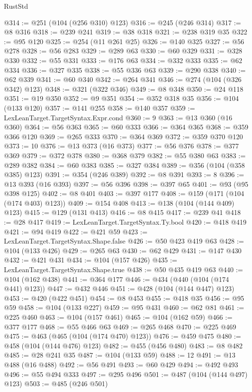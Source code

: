 \begin{lexlean}{RustStd}
\begin{coremodule}
{\begin{coremodule}
{{{{{{{{{{{{{{{{{{{{{{{{{{{{{{{{{{{@314 := @251 (@104 (@256 @310) @123)
@316 := @245 (@246 @314)
@317 := @8 @316
@318 := @239 @241
@319 := @38 @318
@321 := @238 @319 @35
@322 := @95 @120
@325 := @254 (@11 @261 @25)
@326 := @140 @325
@327 := @56 @278
@328 := @56 @283
@329 := @289 @63
@330 := @60 @329
@331 := @328 @330
@332 := @55 @331
@333 := @176 @63
@334 := @332 @333
@335 := @62 @334
@336 := @327 @335
@338 := @55 @336 @63
@339 := @290 @338
@340 := @62 @339
@341 := @60 @340
@342 := @264 @341
@346 := @274 (@104 (@326 @342) @123)
@348 := @321 (@322 @346)
@349 := @8 @348
@350 := @24 @118
@351 := @19 @350
@352 := @9 @351
@354 := @352 @318 @35
@356 := @104 (@133 @120)
@357 := @141 @255
@358 := @140 @357
@359 := LexLeanTarget.TargetSyntax.Expr.cond
@360 := 9
@363 := @13 @360 (@16 @360)
@364 := @56 @363
@365 := @60 @333
@366 := @364 @365
@368 := @359 @366 @120
@369 := @265 @333
@370 := @364 @369
@372 := @359 @370 @120
@373 := 10
@376 := @13 @373 (@16 @373)
@377 := @56 @376
@378 := @377 @369
@379 := @372 @378
@380 := @368 @379
@382 := @55 @380 @63
@383 := @289 @382
@384 := @60 @383
@385 := @327 @384
@389 := @356 (@104 (@358 @385) @123)
@391 := @354 (@246 @389)
@392 := @8 @391
@393 := 8
@396 := @13 @393 (@16 @393)
@397 := @56 @396
@398 := @397 @65
@401 := @93 (@95 @398 @125)
@402 := @8 @401
@403 := @397 @177
@408 := @159 (@171 (@104 (@174 @403) @123))
@409 := @154 @408
@413 := @138 (@104 (@144 @409) @123)
@415 := @129 (@131 @413)
@416 := @8 @415
@417 := @239 @41
@418 := @28 @417
@419 := LexLeanTarget.TargetSyntax.Ty.bool
@420 := @418 @419
@421 := @94 @419
@422 := @421 @59
@423 := LexLeanTarget.TargetSyntax.Shape.false
@426 := @50 @423 @419 @63
@428 := @104 (@133 @426)
@429 := @265 @63
@430 := @62 @429
@431 := @147 @430
@432 := @421 @431
@434 := @104 (@157 @426)
@435 := LexLeanTarget.TargetSyntax.Shape.true
@438 := @50 @435 @419 @63
@440 := @104 (@162 @438)
@441 := @364 @177
@446 := @434 (@440 (@104 (@174 @441) @123))
@447 := @432 @446
@451 := @428 (@104 (@144 @447) @123)
@453 := @420 (@422 @451)
@454 := @8 @453
@455 := @418 @35
@456 := @95 @59
@458 := @104 (@133 @227)
@459 := @95 @431
@460 := @62 @81
@461 := @225 @460
@463 := @104 (@157 @461)
@465 := @104 (@162 @59)
@466 := @377 @177
@468 := @55 @466 @63
@469 := @265 @468
@470 := @225 @469
@475 := @463 (@465 (@104 (@174 @470) @123))
@476 := @459 @475
@480 := @458 (@104 (@144 @476) @123)
@482 := @455 (@456 @480)
@483 := @8 @482
@485 := @28 @241 @35
@487 := @104 (@133 @59)
@488 := 12
@491 := @13 @488 (@16 @488)
@492 := @56 @491
@493 := @60 @429
@494 := @492 @493
@496 := @55 @494 @333
@497 := @295 @496
@501 := @487 (@104 (@144 @497) @123)
@503 := @485 (@246 @501)
}}}}}}}}}}}}}}}}}}}}}}}}}}}}}}}}}}}
\end{coremodule}}
\end{coremodule}
\end{lexlean}
